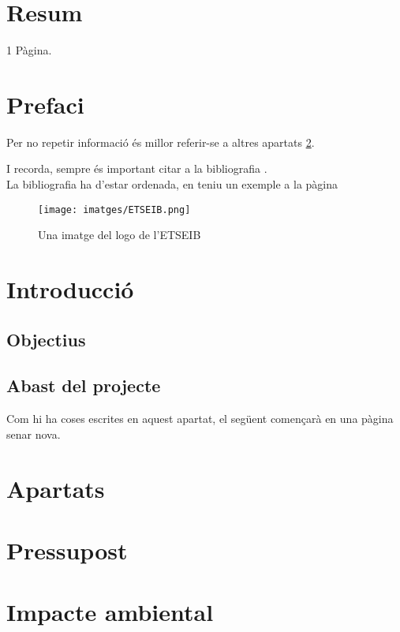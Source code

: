 \documentclass[a4paper,11pt, titlepage, twoside]{article}
\begin{document}
\section*{Resum}
1 Pàgina. 
\lipsum[3-8]
\clearpage\null\newpage

\tableofcontents
\listoffigures


\section{Prefaci}
Per no repetir informació és millor referir-se a altres apartats \ref{introducció}.\par
I recorda, sempre és important citar a la bibliografia \cite{Etiqueta}.\\
La bibliografia ha d'estar ordenada, en teniu un exemple a la pàgina \pageref{biblio}

\begin{figure}[H] %
	\centering
	\texttt{[image: imatges/ETSEIB.png]}
	\caption{Una imatge del logo de l'ETSEIB}
	\label{fig:ETSEIB} %
\end{figure}

\section{Introducció}\label{introducció}
\subsection{Objectius}
\subsection{Abast del projecte}
Com hi ha coses escrites en aquest apartat, el següent començarà en una pàgina senar nova.
\section{Apartats}

\section{Pressupost}

\section{Impacte ambiental}
\end{document}
